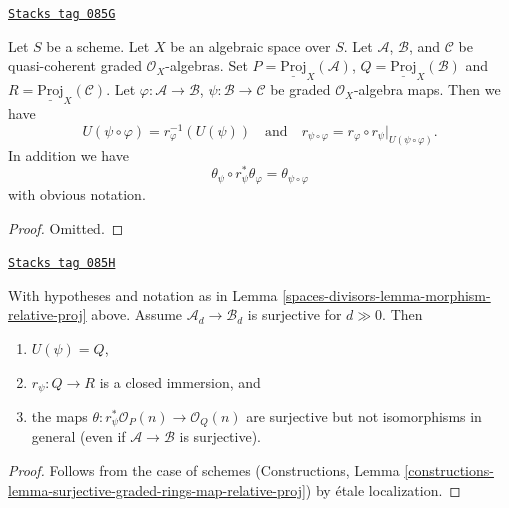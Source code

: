 \begin{lemma}
\label{spaces-divisors-lemma-morphism-relative-proj-transitive}
\href{https://stacks.math.columbia.edu/tag/085G}{\texttt{Stacks tag 085G}}

Let $S$ be a scheme. Let $X$ be an algebraic space over $S$.
Let $\mathcal{A}$, $\mathcal{B}$, and $\mathcal{C}$ be
quasi-coherent graded $\mathcal{O}_X$-algebras.
Set $P = \underline{\text{Proj}}_X(\mathcal{A})$,
$Q = \underline{\text{Proj}}_X(\mathcal{B})$ and
$R = \underline{\text{Proj}}_X(\mathcal{C})$.
Let $\varphi : \mathcal{A} \to \mathcal{B}$,
$\psi : \mathcal{B} \to \mathcal{C}$ be graded $\mathcal{O}_X$-algebra maps.
Then we have
$$
U(\psi \circ \varphi) = r_\varphi^{-1}(U(\psi))
\quad
\text{and}
\quad
r_{\psi \circ \varphi}
=
r_\varphi \circ r_\psi|_{U(\psi \circ \varphi)}.
$$
In addition we have
$$
\theta_\psi \circ r_\psi^*\theta_\varphi
=
\theta_{\psi \circ \varphi}
$$
with obvious notation.
\end{lemma}

\begin{proof}
Omitted.
\end{proof}

\begin{lemma}
\label{spaces-divisors-lemma-surjective-graded-rings-map-relative-proj}
\href{https://stacks.math.columbia.edu/tag/085H}{\texttt{Stacks tag 085H}}

With hypotheses and notation as in Lemma \ref{spaces-divisors-lemma-morphism-relative-proj}
above. Assume $\mathcal{A}_d \to \mathcal{B}_d$ is surjective for
$d \gg 0$. Then
\begin{enumerate}
\item $U(\psi) = Q$,
\item $r_\psi : Q \to R$ is a closed immersion, and
\item the maps $\theta : r_\psi^*\mathcal{O}_P(n) \to \mathcal{O}_Q(n)$
are surjective but not isomorphisms in general (even if
$\mathcal{A} \to \mathcal{B}$ is surjective).
\end{enumerate}
\end{lemma}

\begin{proof}
Follows from the case of schemes
(Constructions, Lemma
\ref{constructions-lemma-surjective-graded-rings-map-relative-proj})
by \'etale localization.
\end{proof}

